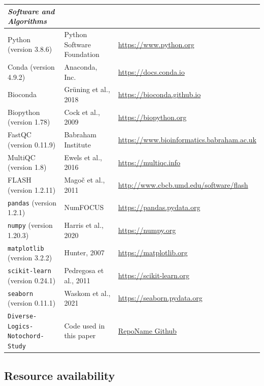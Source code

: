 \begin{landscape}
\begin{longtable}{p{} p{} p{}}
        \hline \textit{Software and Algorithms} \\ \hline
        Python (version 3.8.6)  & Python Software Foundation & \href{https://www.python.org}{https://www.python.org} \\
        Conda (version 4.9.2) & Anaconda, Inc. & \href{https://docs.conda.io/}{https://docs.conda.io} \\
        Bioconda  & Grüning et al., 2018 & \href{https://bioconda.github.io}{https://bioconda.github.io} \\
        Biopython (version 1.78) & Cock et al., 2009 & \href{https://biopython.org}{https://biopython.org} \\
        FastQC (version 0.11.9)	& Babraham Institute & \href{https://www.bioinformatics.babraham.ac.uk/}{https://www.bioinformatics.babraham.ac.uk} \\
        MultiQC (version 1.8) & Ewels et al., 2016 & \href{https://multiqc.info}{https://multiqc.info} \\
        FLASH (version 1.2.11) & Magoč et al., 2011 & \href{http://www.cbcb.umd.edu/software/flash}{http://www.cbcb.umd.edu/software/flash} \\
        \verb|pandas| (version 1.2.1) & NumFOCUS & \href{https://pandas.pydata.org}{https://pandas.pydata.org} \\
        \verb|numpy| (version 1.20.3) & Harris et al., 2020 & \href{https://numpy.org}{https://numpy.org} \\
        \verb|matplotlib| (version 3.2.2) & Hunter, 2007 & \href{https://matplotlib.org/}{https://matplotlib.org} \\
        \verb|scikit-learn| (version 0.24.1) & Pedregosa et al., 2011 & \href{https://scikit-learn.org/}{https://scikit-learn.org} \\
        \verb|seaborn| (version 0.11.1) & Waskom et al., 2021 & \href{https://seaborn.pydata.org/}{https://seaborn.pydata.org} \\
        \verb|Diverse-Logics-Notochord-Study| & Code used in this paper & \href{https://github.com/Github/RepoName}{RepoName Github} \\
    \end{longtable}
\end{landscape}

\subsection{Resource availability}

